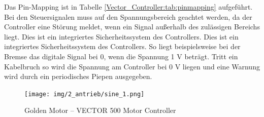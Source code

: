 Das Pin-Mapping ist in Tabelle \ref{Vector_Controller:tab:pinmapping} aufgeführt. Bei den Steuersignalen muss auf den Spannungsbereich geachtet werden, da der Controller eine Störung meldet, wenn ein Signal außerhalb des zulässigen Bereichs liegt. Dies ist ein integriertes Sicherheitssystem des Controllers. Dies ist ein integriertes Sicherheitssystem des Controllers. So liegt beispielsweise bei der Bremse das digitale Signal bei 0, wenn die Spannung 1 V beträgt. Tritt ein Kabelbruch so wird die Spannung am Controller bei 0 V liegen und eine Warnung wird durch ein periodisches Piepen ausgegeben.


\begin{figure}[!ht]
	\begin{center}
		\texttt{[image: img/2\_antrieb/sine\_1.png]}
		\caption{Golden Motor – VECTOR 500 Motor Controller}
		\label{Vector_Controller:img:Antrieb_Controller}
	\end{center}
\end{figure}

